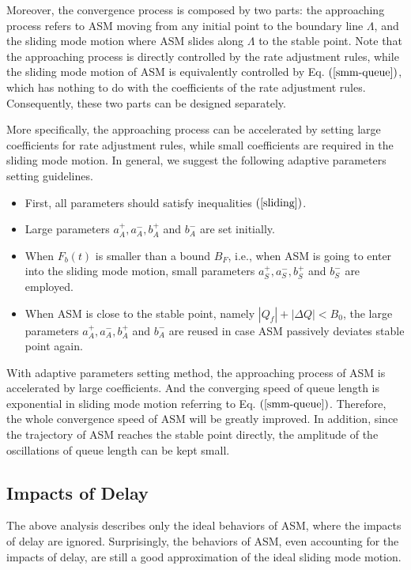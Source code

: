 \documentclass{sig-alternate-10pt}
\begin{document}
Moreover, the convergence process is composed by two parts: the approaching process refers to ASM moving from any initial point to the boundary line $\Lambda$, and the sliding mode motion where ASM slides along $\Lambda$ to the stable point. Note that the approaching process is directly controlled by the rate adjustment rules, while the sliding mode motion of ASM is equivalently controlled by Eq. $(\ref{smm-queue})$, which has nothing to do with the coefficients of the rate adjustment rules. Consequently, these two parts can be designed separately.

More specifically, the approaching process can be accelerated by setting large coefficients for rate adjustment rules, while small coefficients are required in the sliding mode motion. In general, we suggest the following adaptive parameters setting guidelines.
\begin{itemize}
\item First, all parameters should satisfy inequalities $(\ref{sliding})$. 
\item Large parameters $a^+_A, a^-_A, b^+_A$ and $b^-_A$ are set initially.
\item When $F_b(t)$ is smaller than a bound $B_F$, i.e., when ASM is going to enter into the sliding mode motion, small parameters $a^+_S, a^-_S, b^+_S$ and $b^-_S$ are employed.
\item When ASM is close to the stable point, namely $|Q_f|+|\Delta Q|<B_0$, the large parameters $a^+_A, a^-_A, b^+_A$ and $b^-_A$ are reused in case ASM passively deviates stable point again.
\end{itemize}


With adaptive parameters setting method, the approaching process of ASM is accelerated by large coefficients. And the converging speed of queue length is exponential in sliding mode motion referring to Eq. $(\ref{smm-queue})$. Therefore, the whole convergence speed of ASM will be greatly improved. In addition, since the trajectory of ASM reaches the stable point directly, the amplitude of the oscillations of queue length can be kept small.


\subsection{Impacts of Delay}
The above analysis describes only the ideal behaviors of ASM, where the impacts of delay are ignored. Surprisingly, the behaviors of ASM, even accounting for the impacts of delay, are still a good approximation of the ideal sliding mode motion.
\end{document}
